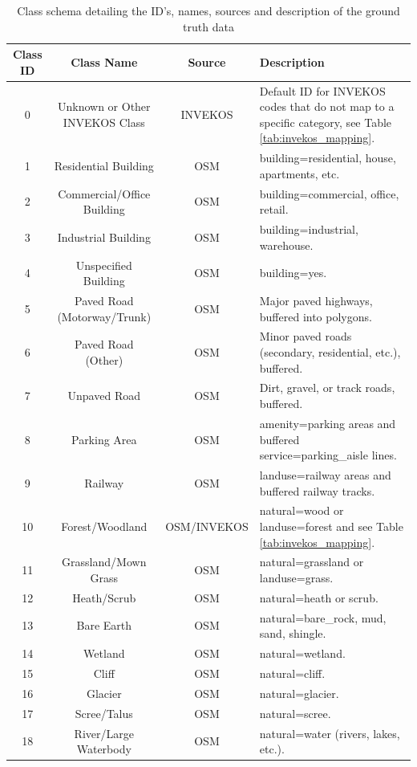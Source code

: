 \documentclass{report}
\begin{document}
\begin{longtable}
{c c c p{4cm}}
\caption{Class schema detailing the ID's, names, sources and description of the ground truth data}
\hline
\toprule
\textbf{Class ID} & \textbf{Class Name} & \textbf{Source} & \textbf{Description} \\
\endhead

\hline
0 & Unknown or Other INVEKOS Class & INVEKOS & Default ID for INVEKOS codes that do not map to a specific category, see Table \ref{tab:invekos_mapping}. \\
\hline
1 & Residential Building & OSM & building=residential, house, apartments, etc. \\
\hline
2 & Commercial/Office Building & OSM & building=commercial, office, retail. \\
\hline
3 & Industrial Building & OSM & building=industrial, warehouse. \\
\hline
4 & Unspecified Building & OSM & building=yes. \\
\hline
5 & Paved Road (Motorway/Trunk) & OSM & Major paved highways, buffered into polygons. \\
\hline
6 & Paved Road (Other) & OSM & Minor paved roads (secondary, residential, etc.), buffered. \\
\hline
7 & Unpaved Road & OSM & Dirt, gravel, or track roads, buffered. \\
\hline
8 & Parking Area & OSM & amenity=parking areas and buffered service=parking\_aisle lines. \\
\hline
9 & Railway & OSM & landuse=railway areas and buffered railway tracks. \\
\hline
10 & Forest/Woodland & OSM/INVEKOS & natural=wood or landuse=forest and see Table \ref{tab:invekos_mapping}. \\
\hline
11 & Grassland/Mown Grass & OSM & natural=grassland or landuse=grass. \\
\hline
12 & Heath/Scrub & OSM & natural=heath or scrub. \\
\hline
13 & Bare Earth & OSM & natural=bare\_rock, mud, sand, shingle. \\
\hline
14 & Wetland & OSM & natural=wetland. \\
\hline
15 & Cliff & OSM & natural=cliff. \\
\hline
16 & Glacier & OSM & natural=glacier. \\
\hline
17 & Scree/Talus & OSM & natural=scree. \\
\hline
18 & River/Large Waterbody & OSM & natural=water (rivers, lakes, etc.). \\

\end{longtable}
\end{document}
